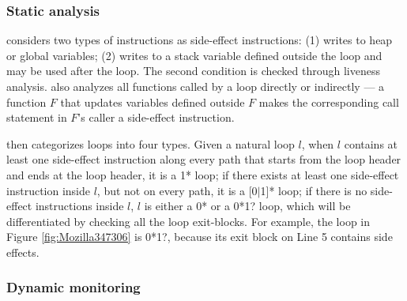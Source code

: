 
\subsubsection{Static analysis}
\label{sec:s_workless}

\Tool considers two types of instructions as side-effect instructions:
(1) writes to heap or global variables;
(2) writes to a stack variable defined outside the loop and
may be used after the loop.
The second condition is checked through liveness analysis.
\Tool also analyzes all functions called
by a loop directly or indirectly --- a function $F$ that updates variables
defined outside $F$ makes the corresponding call statement in $F$'s
caller a side-effect instruction.

\Tool then categorizes loops into four types.
Given a natural loop $l$, when $l$
contains at least one side-effect instruction along every path that
starts from the loop header and ends at the loop header, it is a 1* loop;
if there exists at least one side-effect instruction inside $l$, but not on
every path,
it is a [0$|$1]* loop; if there is no side-effect instructions inside $l$,
$l$ is either a 0* or a 0*1? loop, which will be differentiated by checking
all the loop exit-blocks.
For example, the loop in Figure \ref{fig:Mozilla347306} is 0*1?, because 
its exit block on Line 5 contains side effects.


\subsubsection{Dynamic monitoring}
\label{sec:d_workless}

